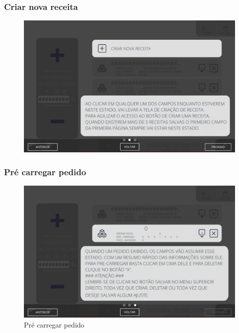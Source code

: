 \newpage
\thispagestyle{fancy}
\vspace*{40 pt}
\subsubsection{\small{Criar nova receita}} \label{sec:telaVisualizacaoReceitasCriarNovaReceita}
\vspace*{\fill}
\begin{figure}[h]
    \centering
    \includegraphics[width=576 px,height=360 px]{src/imagesICV/09-request/visualization/e-2.png}
\end{figure}
\vspace*{\fill}

\newpage
\thispagestyle{fancy}
\vspace*{40 pt}
\subsubsection{\small{Pré carregar pedido}} \label{sec:telaVisualizacaoReceitasPreCarregarPedido}
\vspace*{\fill}
\begin{figure}[h]
    \centering
    \includegraphics[width=576 px,height=360 px]{src/imagesICV/09-request/visualization/e-3.png}
    \caption{Pré carregar pedido}
\end{figure}
\vspace*{\fill}

